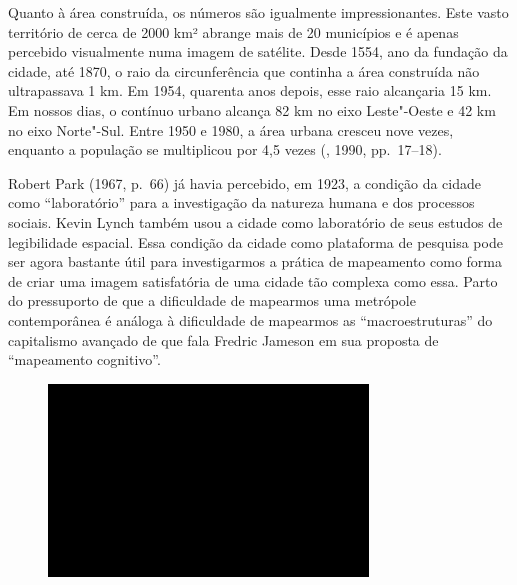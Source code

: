 Quanto à área construída, os números são igualmente impressionantes.
Este vasto território de cerca de 2000 km² abrange mais de 20 municípios
e é apenas percebido visualmente numa imagem de satélite. Desde 1554,
ano da fundação da cidade, até 1870, o raio da circunferência que
continha a área construída não ultrapassava 1 km. Em 1954, quarenta anos
depois, esse raio alcançaria 15 km. Em nossos dias, o contínuo urbano
alcança 82 km no eixo Leste"-Oeste e 42 km no eixo Norte"-Sul. Entre 1950
e 1980, a área urbana cresceu nove vezes, enquanto a população se
multiplicou por 4,5 vezes (, 1990, pp.~17--18).

Robert Park (1967, p.~66) já havia percebido, em 1923, a condição da
cidade como ``laboratório'' para a investigação da natureza humana e dos
processos sociais. Kevin Lynch também usou a cidade como laboratório de
seus estudos de legibilidade espacial. Essa condição da cidade como
plataforma de pesquisa pode ser agora bastante útil para investigarmos a
prática de mapeamento como forma de criar uma imagem satisfatória de uma
cidade tão complexa como essa. Parto do pressuporto de que a dificuldade
de mapearmos uma metrópole contemporânea é análoga à dificuldade de
mapearmos as ``macroestruturas'' do capitalismo avançado de que fala
Fredric Jameson em sua proposta de ``mapeamento cognitivo''.

\begin{figure}[!ht]

\centering
 \includegraphics[width=85mm]{./imgs/im1.jpg}
\caption{\tiny{}}

\end{figure}

